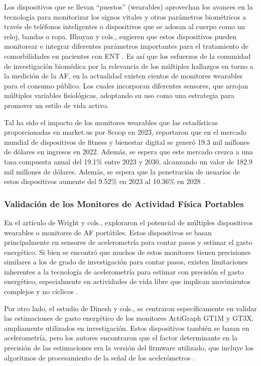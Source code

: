 Los dispositivos que se llevan ``puestos'' (wearables) aprovechan los avances en la tecnología para monitorizar los signos vitales y otros parámetros biométricos a través de teléfonos inteligentes o dispositivos que se adosan al cuerpo como un reloj, bandas o ropa. Bhuyan y cols., sugieren que estos dispositivos pueden monitorear e integrar diferentes parámetros importantes para el tratamiento de comorbilidades en pacientes con ENT \citep{Bhuyan2016Mobile}. Es así que los esfuerzos de la comunidad de investigación biomédica por la relevancia de los múltiples hallazgos en torno a la medición de la AF, en la actualidad existen cientos de monitores wearables para el consumo público. Los cuales incorporan diferentes sensores, que arrojan múltiples variables fisiológicas, adoptando su uso como una estrategia para promover un estilo de vida activo.

Tal ha sido el impacto de los monitores wearables que las estadísticas proporcionadas en market.us por Scoop en 2023, reportaron que en el mercado mundial de dispositivos de fitness y bienestar digital se generó 19.3 mil millones de dólares en ingresos en 2022. Además, se espera que este mercado crezca a una tasa compuesta anual del 19.1\% entre 2023 y 2030, alcanzando un valor de 182.9 mil millones de dólares. Además, se espera que la penetración de usuarios de estos dispositivos aumente del 9.52\% en 2023 al 10.36\% en 2028 \citep{Tajammul2023Statistics}.

\subsubsection{Validación de los Monitores de Actividad Física Portables}
\label{subsubsec:validacion_monitores_af}

En el artículo de Wright y cols., exploraron el potencial de múltiples dispositivos wearables o monitores de AF portátiles. Estos dispositivos se basan principalmente en sensores de acelerometría para contar pasos y estimar el gasto energético. Si bien se encontró que muchos de estos monitores tienen precisiones similares a los de grado de investigación para contar pasos, existen limitaciones inherentes a la tecnología de acelerometría para estimar con precisión el gasto energético, especialmente en actividades de vida libre que implican movimientos complejos y no cíclicos \citep{Wright2017ConsumerMonitors}.

Por otro lado, el estudio de Dinesh y cols., se centraron específicamente en validar las estimaciones de gasto energético de los monitores ActiGraph GT1M y GT3X, ampliamente utilizados en investigación. Estos dispositivos también se basan en acelerometría, pero los autores encontraron que el factor determinante en la precisión de las estimaciones era la versión del firmware utilizado, que incluye los algoritmos de procesamiento de la señal de los acelerómetros \citep{Dinesh2014ActiGraph}.

